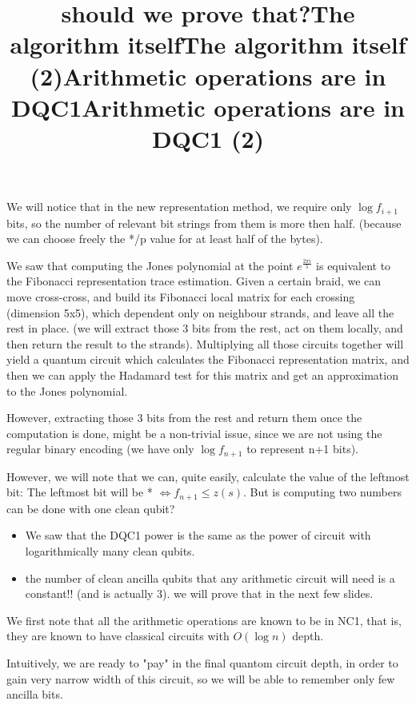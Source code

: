 \documentclass{article}
\begin{document}
\title{should we prove that?}


\title{The algorithm itself}
We will notice that in the new representation method, we require only $\log{f_{i+1}}$ bits, so the number of relevant bit strings from them is more then half. (because we can choose freely the */p value for at least half of the bytes).

We saw that computing the Jones polynomial at the point $e^{\frac{2{\pi}i}{5}}$ is equivalent to the Fibonacci representation trace estimation.
Given a certain braid, we can move cross-cross, and build its Fibonacci local matrix for each crossing (dimension 5x5), which dependent only on  neighbour strands, and leave all the rest in place. (we will extract those 3 bits from the rest, act on them locally, and then return the result to the strands). Multiplying all those circuits together will yield a quantum circuit which calculates the Fibonacci representation matrix, and then we can apply the Hadamard test for this matrix and get an approximation to the Jones polynomial.


\title{The algorithm itself (2)}
However, extracting those 3 bits from the rest and return them once the computation is done, might be a non-trivial issue, since we are not using the regular binary encoding (we have only $\log{f_{n+1}}$ to represent n+1 bits). 

However, we will note that we can, quite easily, calculate the value of the leftmost bit: The leftmost bit will be * $\iff f_{n+1} \leq z(s)$. But is computing two numbers can be done with one clean qubit?


\title{Arithmetic operations are in DQC1}
\begin{itemize}
\item We saw that the DQC1 power is the same as the power of circuit with logarithmically many clean qubits. 

\item the number of clean ancilla qubits that any arithmetic circuit will need is a constant!! (and is actually 3). we will prove that in the next few slides. 
\end{itemize}



\title{Arithmetic operations are in DQC1 (2)}
We first note that all the arithmetic operations are known to be in NC1, that is, they are known to have classical circuits with $O(\log{n})$ depth.

Intuitively, we are ready to "pay" in the final quantom circuit depth, in order to gain very narrow width of this circuit, so we will be able to remember only few ancilla bits.
\end{document}
